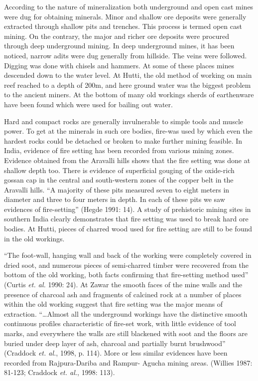 \vspace{-.2cm}

According to the nature of mineralization both underground and open cast mines were dug for obtaining minerals. Minor and shallow ore deposits were generally extracted through shallow pits and trenches. This process is termed open cast mining. On the contrary, the major and richer ore deposits were procured through deep underground mining. In deep underground mines, it has been noticed, narrow adits were dug generally from hillside. The veins were followed. Digging was done with chisels and hammers. At some of these places mines descended down to the water level.  At Hutti, the old method of working on main reef reached to a depth of 200m, and here ground water was the biggest problem to the ancient miners. At the bottom of many old workings sherds of earthenware have been found which were used for bailing out water. 


Hard and compact rocks are generally invulnerable to simple tools and muscle power. To get at the minerals in such ore bodies, fire-was used by which even the hardest rocks could be detached or broken to make further mining feasible. In India, evidence of fire setting has been recorded from various mining zones. Evidence obtained from the Aravalli hills shows that the fire setting was done at shallow depth too. There is evidence of superficial gouging of the oxide-rich gossan cap in the central and south-western zones of the copper belt in the Aravalli hills. “A majority of these pits measured seven to eight meters in diameter and three to four meters in depth. In each of these pits we saw evidences of fire-setting” (Hegde 1991: 14). A study of prehistoric mining sites in southern India clearly demonstrates that fire setting was used to break hard ore bodies. At Hutti, pieces of charred wood used for fire setting are still to be found in the old workings. 

“The foot-wall, hanging wall and back of the working were completely covered in dried soot, and numerous pieces of semi-charred timber were recovered from the bottom of the old working, both facts confirming that fire-setting method used” (Curtis {\it et. al.} 1990: 24). At Zawar the smooth faces of the mine walls and the presence of charcoal ash and fragments of calcined rock at a number of places within the old working suggest that fire setting was the major means of extraction. “…Almost all the underground workings have the distinctive smooth continuous profiles characteristic of fire-set work, with little evidence of tool marks, and everywhere the walls are still blackened with soot and the floors are buried under deep layer of ash, charcoal and partially burnt brushwood” (Craddock {\it et. al.}, 1998, p. 114). More or less similar evidences have been recorded from Rajpura-Dariba and Rampur- Agucha mining areas. (Willies 1987: 81-123; Craddock {\it et. al.}, 1998: 113).

